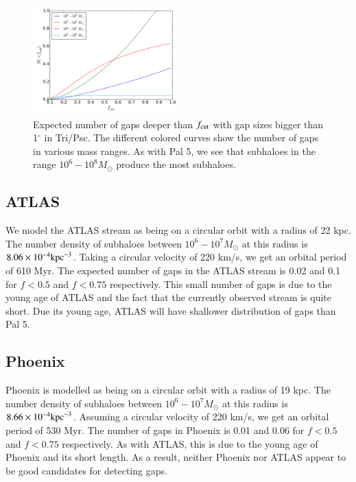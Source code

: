 \documentclass[useAMS,usenatbib]{mn2e}
\begin{document}
\begin{figure}
\centering
\includegraphics[width=0.5\textwidth]{observable_number_vs_f_cut_tripsc_array.pdf}
\caption{Expected number of gaps deeper than $f_{\rm cut}$ with gap sizes bigger than 1$^\circ$ in Tri/Psc. The different colored curves show the number of gaps in various mass ranges. As with Pal 5, we see that subhaloes in the range $10^6-10^8 M_\odot$ produce the most subhaloes. } 
\label{fig:expected_gaps_tripsc}
\end{figure}  

\subsection{ATLAS}

We model the ATLAS stream as being on a circular orbit with a radius of 22 kpc. The number density of subhaloes between $10^6 - 10^7 M_\odot$ at this radius is $8.06 \times 10^{-4} {\rm kpc}^{-3}$. Taking a circular velocity of 220 km/s, we get an orbital period of 610 Myr. The expected number of gaps in the ATLAS stream is 0.02 and 0.1 for $f<0.5$ and $f<0.75$ respectively. This small number of gaps is due to the young age of ATLAS and the fact that the currently observed stream is quite short. Due its young age, ATLAS will have shallower distribution of gaps than Pal 5.

\subsection{Phoenix}

Phoenix is modelled as being on a circular orbit with a radius of 19 kpc. The number density of subhaloes between $10^6-10^7 M_\odot$ at this radius is $8.66 \times 10^{-4} {\rm kpc}^{-3}$. Assuming a circular velocity of 220 km/s, we get an orbital period of 530 Myr. The number of gaps in Phoenix is 0.01 and 0.06 for $f<0.5$ and $f<0.75$ respectively. As with ATLAS, this is due to the young age of Phoenix and its short length. As a result, neither Phoenix nor ATLAS appear to be good candidates for detecting gaps. 
\end{document}
